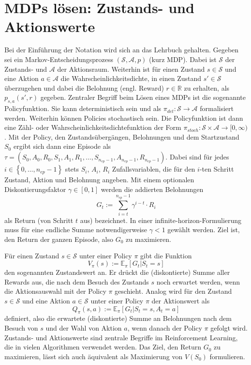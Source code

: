 \section{MDPs lösen: Zustands- und Aktionswerte}
\label{section:mdp_fundamentals}
Bei der Einführung der Notation wird sich an das Lehrbuch \cite{Sutton1998} gehalten.
Gegeben sei ein Markov-Entscheidungsprozess $(\mathcal{S}, \mathcal{A}, p)$ (kurz MDP).
Dabei ist $\mathcal{S}$ der Zustands- und $\mathcal{A}$ der Aktionsraum.
Weiterhin ist für einen Zustand $s\in \mathcal{S}$ und eine Aktion $a \in \mathcal{A}$ die Wahrscheinlichkeitsdichte, in einen Zustand $s' \in \mathcal{S}$ überzugehen und dabei die Belohnung (engl. Reward) $r \in \mathbb{R}$ zu erhalten, als $p_{s,a}(s', r)$ gegeben.
Zentraler Begriff beim Lösen eines MDPs ist die sogenannte Policyfunktion.
Sie kann deterministisch sein und als $\pi_{det}: \mathcal{S} \rightarrow \mathcal{A}$ formalisiert werden.
Weiterhin können Policies stochastisch sein.
Die Policyfunktion ist dann eine Zähl- oder Wahrscheinlichkeitsdichtefunktion der Form $\pi_{stoch}: \mathcal{S}\times\mathcal{A}\rightarrow [0, \infty)$.
Mit der Policy, den Zustandsübergängen, Belohnungen und dem Startzustand $S_0$ ergibt sich dann eine Episode als $\tau = \left(S_0, A_0, R_0, S_1, A_1, R_1, \dots, S_{n_{ep} - 1}, A_{n_{ep} - 1}, R_{n_{ep} - 1}\right)$.
Dabei sind für jedes $i \in \left\lbrace0, \dots, n_{ep} - 1\right\rbrace$ stets $S_i$, $A_i$, $R_i$ Zufallsvariablen, die für den $i$-ten Schritt Zustand, Aktion und Belohnung angeben.
Mit einem optionalen Diskontierungsfaktor $\gamma \in [0, 1]$ werden die addierten Belohnungen
\begin{equation}
	G_t := \sum_{i=t}^{n_{ep} - 1} \gamma^{i - t} \cdot R_i
\end{equation}
als Return (von Schritt $t$ aus) bezeichnet.
In einer infinite-horizon-Formulierung muss für eine endliche Summe notwendigerweise $\gamma < 1$ gewählt werden.
Ziel ist, den Return der ganzen Episode, also $G_0$ zu maximieren.

Für einen Zustand $s \in \mathcal{S}$ unter einer Policy $\pi$ gibt die Funktion
\begin{equation}
	V_\pi(s) := \mathbb{E}_\pi\left[G_t | S_t = s\right]
\end{equation}
den sogenannten Zustandswert an.
Er drückt die (diskontierte) Summe aller Rewards aus, die nach dem Besuch des Zustands $s$ noch erwartet werden, wenn die Aktionsauswahl mit der Policy $\pi$ geschieht.
Analog wird für den Zustand $s \in \mathcal{S}$ und eine Aktion $a \in \mathcal{S}$ unter einer Policy $\pi$ der Aktionswert als
\begin{equation}
	Q_\pi(s, a) := \mathbb{E}_\pi\left[G_t | S_t = s, A_t = a\right]
\end{equation}
definiert, also die erwartete (diskontierte) Summe an Belohnungen nach dem Besuch von $s$ und der Wahl von Aktion $a$, wenn danach der Policy $\pi$ gefolgt wird.
Zustands- und Aktionswerte sind zentrale Begriffe im Reinforcement Learning, die in vielen Algorithmen verwendet werden.
Das Ziel, den Return $G_0$ zu maximieren, lässt sich auch äquivalent als Maximierung von $V(S_0)$ formulieren.

